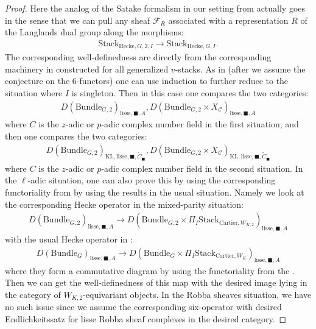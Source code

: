 \documentclass[12pt]{book}
\theoremstyle{definition}
\begin{document}
\begin{proof}
Here the analog of the Satake formalism in our setting from \cite{FS} actually goes in the sense that we can pull any sheaf $\mathcal{F}_R$ associated with a representation $R$ of the Langlands dual group along the morphisms:
\begin{align}
\mathrm{Stack}_{\mathrm{Hecke},G,2,I} \rightarrow \mathrm{Stack}_{\mathrm{Hecke},G,I}.
\end{align} 
The corresponding well-definedness are directly from the corresponding machinery in \cite{FS} constructed for all generalized $v$-stacks. As in \cite[Corollary 2.3 in Chapter IX]{FS} (after we assume the conjecture on the 6-functors) one can use induction to further reduce to the situation where $I$ is singleton. Then in this case one compares the two categories:
\begin{align}
D(\mathrm{Bundle}_{G,2})_{\text{lisse},\blacksquare,A},D(\mathrm{Bundle}_{G,2}\times X_\mathcal{C})_{\text{lisse},\blacksquare,A}
\end{align}
where $C$ is the $z$-adic or $p$-adic complex number field in the first situation, and then one compares the two categories:
\begin{align}
D(\mathrm{Bundle}_{G,2})_{\text{KL},\mathrm{lisse},\blacksquare,\widetilde{C}_\blacksquare},D(\mathrm{Bundle}_{G,2}\times X_\mathcal{C})_{\text{KL},\mathrm{lisse},\blacksquare,\widetilde{C}_\blacksquare}
\end{align}
where $C$ is the $z$-adic or $p$-adic complex number field in the second  situation. In the $\ell$-adic situation, one can also prove this by using the corresponding functoriality from \cite{FS} by using the results in the usual situation. Namely we look at the corresponding Hecke operator in the mixed-parity situation:
\begin{align}
D(\mathrm{Bundle}_{G,2})_{\text{lisse},\blacksquare,A} \rightarrow D(\mathrm{Bundle}_{G,2}\times \Pi_I \mathrm{Stack}_{\mathrm{Cartier},W_{K,2}})_{\text{lisse},\blacksquare,A}
\end{align}
with the usual Hecke operator in \cite{FS}:
\begin{align}
D(\mathrm{Bundle}_{G})_{\text{lisse},\blacksquare,A} \rightarrow D(\mathrm{Bundle}_{G}\times \Pi_I \mathrm{Stack}_{\mathrm{Cartier},W_{K}})_{\text{lisse},\blacksquare,A}
\end{align}
where they form a commutative diagram by using the functoriality from the \cite{FS}. Then we can get the well-definedness of this map with the desired image lying in the category of $W_{K,2}$-equivariant objects. In the Robba sheaves situation, we have no such issue since we assume the corresponding six-operator with desired Endlichkeitssatz for lisse Robba sheaf complexes in the desired category.
\end{proof}
\end{document}
